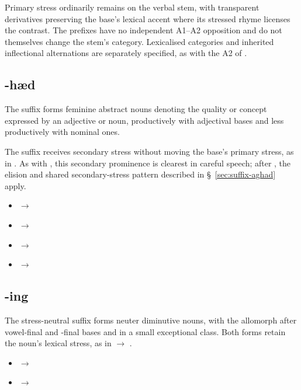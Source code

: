 Primary stress ordinarily remains on the verbal stem, with transparent derivatives preserving the base's lexical accent where its stressed rhyme licenses the contrast. The prefixes have no independent A1--A2 opposition and do not themselves change the stem's category. Lexicalised categories and inherited inflectional alternations are separately specified, as with the A2 of .

\subsection{-hæd}
\label{sec:suffix-haed}

The suffix  forms feminine abstract nouns denoting the quality or concept expressed by an adjective or noun, productively with adjectival bases and less productively with nominal ones.

The suffix receives secondary stress without moving the base's primary stress, as in . As with , this secondary prominence is clearest in careful speech; after , the elision and shared secondary-stress pattern described in \S~\ref{sec:suffix-aghad} apply.

\begin{itemize}
    \item {} $\rightarrow$ 
    \item {} $\rightarrow$ 
    \item {} $\rightarrow$ 
    \item {} $\rightarrow$ 
\end{itemize}

\subsection{-ing}
\label{sec:diminutives}

The stress-neutral suffix  forms neuter diminutive nouns, with the allomorph  after vowel-final and -final bases and in a small exceptional class. Both forms retain the noun's lexical stress, as in  $\rightarrow$ .

\begin{itemize}
    \item {} $\rightarrow$ 
    \item {} $\rightarrow$ 
\end{itemize}

